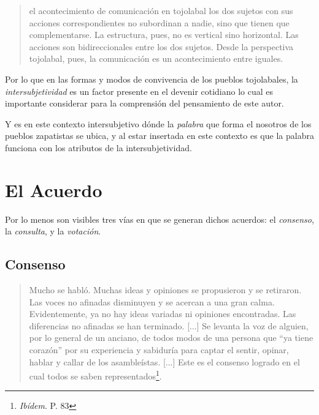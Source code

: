 \documentclass[oneside]{book}
\begin{document}
\begin{quote}
el acontecimiento de comunicación en tojolabal los dos sujetos con sus acciones correspondientes no subordinan a nadie, sino que tienen que complementarse. La estructura, pues, no es vertical sino horizontal. Las acciones son bidireccionales entre los dos sujetos. Desde la perspectiva tojolabal, pues, la comunicación es un acontecimiento entre iguales.
\end{quote}

Por lo que en las formas y modos de convivencia de los pueblos tojolabales, la \textit{intersubjetividad} es un factor presente en el devenir cotidiano lo cual es importante considerar para la comprensión del pensamiento de este autor.

Y es en este contexto intersubjetivo dónde la \textit{palabra} que forma el nosotros de los pueblos zapatistas se ubica, y al estar insertada en este contexto es que la palabra funciona con los atributos de la intersubjetividad. 

\section{El Acuerdo}

Por lo menos son visibles tres vías en que se generan dichos acuerdos: el \textit{consenso}, la \textit{consulta}, y la \textit{votación}.

\subsection{Consenso}
\begin{quote}
Mucho se habló. Muchas ideas y opiniones se propusieron y se retiraron. Las voces no afinadas disminuyen y se acercan a una gran calma. Evidentemente, ya no hay ideas variadas ni opiniones encontradas. Las diferencias no afinadas se han terminado. [...] Se levanta la voz de alguien, por lo general de un anciano, de todos modos de una persona que “ya tiene corazón” por su experiencia y sabiduría para captar el sentir, opinar, hablar y callar de los asambleístas. [...] Este es el consenso logrado en el cual todos se saben representados\footnote{\textit{Ibídem}. P. 83}.
\end{quote}	
\end{document}
